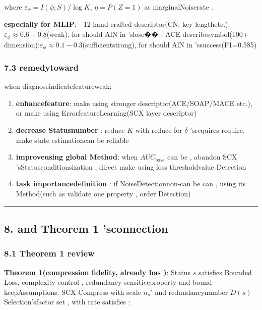 \documentclass[
  12pt,
]{article}
\providecommand{\tightlist}{%
  \setlength{\itemsep}{0pt}\setlength{\parskip}{0pt}}
\begin{document}
where \(\varepsilon_\phi = I(\phi; S) / \log K\), \(\eta = P(Z=1)\)
as marginalNoiserate . 

\textbf{especially for  MLIP}:  - 12
hand-crafted descriptor(CN, key lengthetc.):\(\varepsilon_\phi \approx 0.6-0.8\)(weak), for should 
AlN in 'slose�� - ACE describesymbol(100+
dimension):\(\varepsilon_\phi \approx 0.1-0.3\)(sufficientstrong), for should  AlN
in 'ssuccess(F1=0.585)

\subsubsection{7.3 remedytoward }\label{ux8865ux6551ux65b9ux5411}

when diagnoseindicatefeatureweak: 

\begin{enumerate}
\def\labelenumi{\arabic{enumi}.}
\tightlist
\item
  \textbf{enhancefeature}: make using stronger descriptor(ACE/SOAP/MACE
  etc.), or make using ErrorfeatureLearning(SCX layer descriptor)
\item
  \textbf{decrease Statusnumber }: reduce  \(K\) with reduce for  \(\delta\)
  'srequires require, make state estimationcan be reliable
\item
  \textbf{improveusing global Method}: when  \(AUC_{\text{base}}\) can be , abandon SCX
  'sStatusconditionsization , direct make using loss thresholdvalue Detection
\item
  \textbf{task importancedefinition }: if NoiseDetectionnon-can be can , using its Method(such as validate one property , order Detection)
\end{enumerate}

\begin{center}\rule{0.5\linewidth}{0.5pt}\end{center}

\subsection{8. and  Theorem 1
'sconnection}\label{ux4e0e-theorem-1-ux7684ux8054ux7cfb}

\subsubsection{8.1 Theorem 1 review}\label{theorem-1-ux56deux987e}

\textbf{Theorem 1(compression fidelity, already has )}: Status \(s\)
satisfies Bounded Loss, complexity control , redundancy-sensitiveproperty and bound keepAssumptions. SCX-Compress
with scale  \(n_s'\) and redundancynumber  \(D(s)\) Selection'sfactor set , with rate satisfies : 
\end{document}
